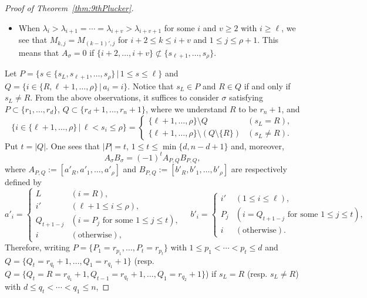 \documentclass[12pt]{amsart}%
\theoremstyle{definition}
\begin{document}
\begin{proof}[Proof of Theorem~\ref{thm:9thPlucker}]
\begin{itemize}
\item When  $\lambda_i>\lambda_{i+1}=\cdots=\lambda_{i+v}>\lambda_{i+v+1}$ for some $i$ and $v\ge 2$ with $i\ge \ell$,
we see that 
$M_{k,j}=M_{(k-1)',j}$ for $i+2\le k\le i+v$ and $1\le j\le \rho+1$. 
This means that 
$A_{\sigma}=0$ if $\{i+2,\ldots,i+v\}\not\subset\{s_{\ell+1},\ldots,s_{\rho}\}$.
\end{itemize}
Let 
$P=\{s\in \{s_L,s_{\ell+1},\ldots,s_{\rho}\}\,|\,1\le s\le \ell\}$ and 
$Q=\{i\in\{R,\ell+1,\ldots,\rho\}\,|\,a_i=i\}$.
Notice that $s_L\in P$ and $R\in Q$ 
if and only if $s_L\ne R$.
From the above observations, 
it suffices to consider $\sigma$ satisfying  
$P\subset\{r_1,\ldots,r_d\}$, 
$Q\subset\{r_d+1,\ldots,r_{n}+1\}$,
where we understand $R$ to be $r_n+1$, and    
\[
 \{i\in \{\ell+1,\ldots,\rho\}\,|\,\ell<s_i\le \rho\}
=   
\begin{cases}
 \{\ell+1,\ldots,\rho\}\setminus Q & (s_L=R),\\   
 \{\ell+1,\ldots,\rho\}\setminus (Q\setminus\{R\}) & (s_L\ne R).
\end{cases}
\]
Put $t=|Q|$. 
One sees that 
$|P|=t$, $1\le t\le \min\{d,n-d+1\}$
and, moreover, 
\[
A_{\sigma}B_{\sigma}=(-1)^tA_{P,Q}B_{P,Q},
\]
where 
$A_{P,Q}:=[a'_R,a'_1,\ldots,a'_{\rho}]$ 
and
$B_{P,Q}:=[b'_R,b'_1,\ldots,b'_{\rho}]$ 
are respectively defined by 
\[
a'_i=
\begin{cases}
L & (i=R), \\
i' & (\ell+1\le i\le \rho),\\
Q_{t+1-j} & (\text{$i=P_j$ for some $1\le j\le t$}), \\
i & (\text{otherwise}),
\end{cases}
\quad 
b'_i=
\begin{cases}
i' & (1\le i\le \ell),\\
P_{j} & (\text{$i=Q_{t+1-j}$ for some $1\le j\le t$}), \\
i & (\text{otherwise}).
\end{cases}
\]
Therefore,
writing 
$P=\{P_1=r_{p_1},\ldots,P_t=r_{p_t}\}$
with $1\le p_1<\cdots<p_t\le d$ and 
$Q=\{Q_t=r_{q_t}+1,\ldots,Q_1=r_{q_1}+1\}$
(resp. $Q=\{Q_t=R=r_{q_1}+1,Q_{t-1}=r_{q_t}+1,\ldots,Q_1=r_{q_2}+1\}$) if $s_L=R$ (resp. $s_L\ne R$) with 
$d\le q_t<\cdots<q_1\le n$, 

\end{proof}
\end{document}
